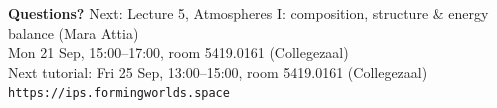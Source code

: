 \documentclass[aspectratio=169, 11pt]{beamer}
\begin{document}
\begin{frame}
  \vfill
  \begin{center}
    {\color{white}\Large\bfseries Questions?}
    \vskip20pt
    {\color{white!85}\large Next: Lecture 5, Atmospheres I: composition, structure \& energy balance (Mara Attia)}\\[4pt]
    {\color{white!85}\small Mon 21 Sep, 15:00--17:00, room 5419.0161 (Collegezaal)}\\[12pt]
    {\color{white!85}\small Next tutorial: Fri 25 Sep, 13:00--15:00, room 5419.0161 (Collegezaal)}\\[20pt]
    {\color{white!70}\small \texttt{https://ips.formingworlds.space}}
  \end{center}
  \vfill
\end{frame}
\end{document}
